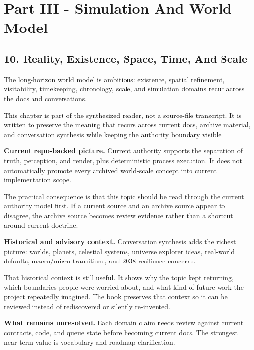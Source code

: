 \documentclass[10.5pt,a4paper,openany]{book}
\begin{document}
\chapter{Part III - Simulation And World Model}


\section{10. Reality, Existence, Space, Time, And Scale}

The long-\allowbreak{}horizon world model is ambitious: existence, spatial refinement, visitability, timekeeping, chronology, scale, and simulation domains recur across the docs and conversations.\allowbreak{}


This chapter is part of the synthesized reader, not a source-\allowbreak{}file transcript.\allowbreak{} It is written to preserve the meaning that recurs across current docs, archive material, and conversation synthesis while keeping the authority boundary visible.\allowbreak{}


\textbf{Current repo-backed picture.} Current authority supports the separation of truth, perception, and render, plus deterministic process execution.\allowbreak{} It does not automatically promote every archived world-\allowbreak{}scale concept into current implementation scope.\allowbreak{}


The practical consequence is that this topic should be read through the current authority model first.\allowbreak{} If a current source and an archive source appear to disagree, the archive source becomes review evidence rather than a shortcut around current doctrine.\allowbreak{}


\textbf{Historical and advisory context.} Conversation synthesis adds the richest picture: worlds, planets, celestial systems, universe explorer ideas, real-\allowbreak{}world defaults, macro/\allowbreak{}micro transitions, and 2038 resilience concerns.\allowbreak{}


That historical context is still useful.\allowbreak{} It shows why the topic kept returning, which boundaries people were worried about, and what kind of future work the project repeatedly imagined.\allowbreak{} The book preserves that context so it can be reviewed instead of rediscovered or silently re-\allowbreak{}invented.\allowbreak{}


\textbf{What remains unresolved.} Each domain claim needs review against current contracts, code, and queue state before becoming current docs.\allowbreak{} The strongest near-\allowbreak{}term value is vocabulary and roadmap clarification.\allowbreak{}
\end{document}
